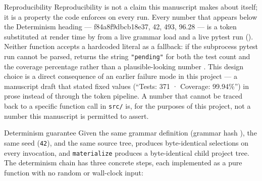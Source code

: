 \documentclass[
  ignorenonframetext,
]{beamer}
\author{\texorpdfstring{}{}}
\date{}
\begin{document}
\begin{frame}{Reproducibility}
\protect{}\label{reproducibility}
Reproducibility is not a claim this manuscript makes about itself; it is
a property the code enforces on every run. Every number that appears
below the Determinism heading --- f84a8f9dbcb18e37, 42, 493, 96.28 ---
is a token substituted at render time by
 from a live
grammar load and a live pytest run
().
Neither function accepts a hardcoded literal as a fallback: if the
subprocess pytest run cannot be parsed, 
returns the string \texttt{"pending"} for both the test count and the
coverage percentage rather than a plausible-looking number
. This design choice is a direct consequence
of an earlier failure mode in this project --- a manuscript draft that
stated fixed values (``Tests: 371 · Coverage: 99.94\%'') in prose
instead of through the token pipeline. A number that cannot be traced
back to a specific function call in \texttt{src/} is, for the purposes
of this project, not a number this manuscript is permitted to assert.

\begin{block}{Determinism guarantee}
\protect{}\label{determinism-guarantee}
Given the same  grammar definition
(grammar hash ), the same seed (\texttt{42}),
and the same  source tree,
 produces byte-identical
selections on every invocation, and \texttt{materialize} produces a
byte-identical child project tree. The determinism chain has three
concrete steps, each implemented as a pure function with no random or
wall-clock input:


\end{block}
\end{frame}
\end{document}
